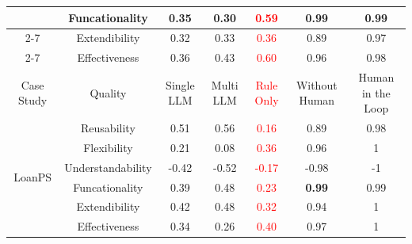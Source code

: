 \documentclass[pdflatex,sn-mathphys-num]{sn-jnl}%
\theoremstyle{thmstyleone}%
\theoremstyle{thmstyletwo}%
\theoremstyle{thmstylethree}%
\begin{document}
\begin{table}[!htb]
{\begin{threeparttable}
\begin{tabular}{|c|c|cc|c|cc|}
                            & Funcationality           & \multicolumn{1}{c|}{0.35}           & 0.30           & \multicolumn{1}{c|}{\textcolor{red}{0.59}}          & \multicolumn{1}{c|}{\textbf{0.99}}          & 0.99              \\ \cline{2-7} 
                            & Extendibility            & \multicolumn{1}{c|}{0.32}           & 0.33           & \multicolumn{1}{c|}{\textcolor{red}{0.36}}          & \multicolumn{1}{c|}{0.89}          & 0.97              \\ \cline{2-7} 
                            & Effectiveness            & \multicolumn{1}{c|}{0.36}           & 0.43           & \multicolumn{1}{c|}{\textcolor{red}{0.60}}          & \multicolumn{1}{c|}{0.96}          & 0.98              \\ \hline
Case Study                  & Quality                  & \multicolumn{1}{c|}{Single LLM}     & Multi LLM      & \multicolumn{1}{c|}{\textcolor{red}{Rule Only}} & \multicolumn{1}{c|}{Without Human} & Human in the Loop \\ \hline
\multirow{6}{*}{LoanPS}     & Reusability              & \multicolumn{1}{c|}{0.51}           & 0.56           & \multicolumn{1}{c|}{\textcolor{red}{0.16}}          & \multicolumn{1}{c|}{0.89}          & 0.98              \\ \cline{2-7} 
                            & Flexibility              & \multicolumn{1}{c|}{0.21}           & 0.08           & \multicolumn{1}{c|}{\textcolor{red}{0.36}}          & \multicolumn{1}{c|}{0.96}          & 1                 \\ \cline{2-7} 
                            & Understandability        & \multicolumn{1}{c|}{-0.42} & -0.52          & \multicolumn{1}{c|}{\textcolor{red}{-0.17}}          & \multicolumn{1}{c|}{-0.98}         & -1                \\ \cline{2-7} 
                            & Funcationality           & \multicolumn{1}{c|}{0.39}           & 0.48           & \multicolumn{1}{c|}{\textcolor{red}{0.23}}          & \multicolumn{1}{c|}{\textbf{0.99}}          & 0.99              \\ \cline{2-7} 
                            & Extendibility            & \multicolumn{1}{c|}{0.42}           & 0.48           & \multicolumn{1}{c|}{\textcolor{red}{0.32}}          & \multicolumn{1}{c|}{0.94}          & 1                 \\ \cline{2-7} 
                            & Effectiveness            & \multicolumn{1}{c|}{0.34}           & 0.26           & \multicolumn{1}{c|}{\textcolor{red}{0.40}}          & \multicolumn{1}{c|}{0.97}          & 1                 \\ \hline

\end{tabular}
\end{threeparttable}}
\end{table}
\end{document}
